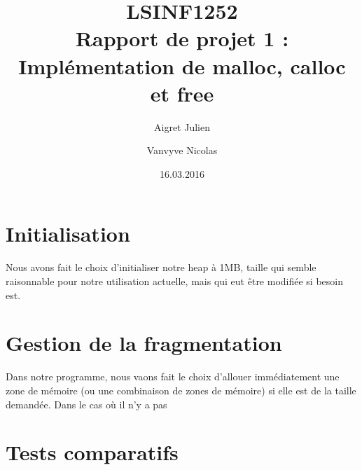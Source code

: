 \documentclass[10pt,a4paper]{article}
\author{Aigret Julien\and Vanvyve Nicolas}
\date{16.03.2016}
\title{LSINF1252\\Rapport de projet 1 :\\Implémentation de malloc, calloc et free}
\begin{document}
\maketitle

\tableofcontents %

\section{Initialisation}
Nous avons fait le choix d'initialiser notre heap à 1MB, taille qui semble raisonnable pour notre utilisation actuelle, mais qui eut être modifiée si besoin est.

\section{Gestion de la fragmentation}
Dans notre programme, nous vaons fait le choix d'allouer immédiatement une zone de mémoire (ou une combinaison de zones de mémoire) si elle est de la taille demandée. Dans le cas où il n'y a pas
\section{Tests comparatifs}





\end{document}
